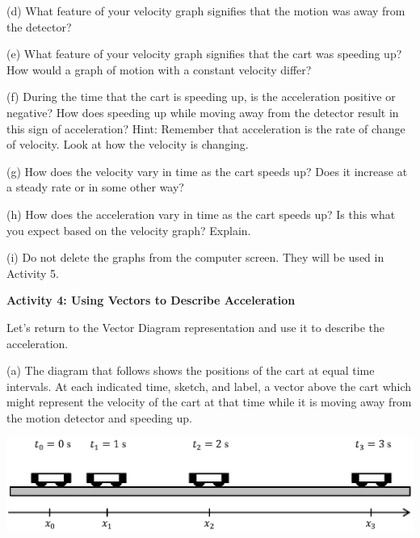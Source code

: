 (d) What feature of your velocity graph signifies that the motion was away from
the detector? 
\vspace{13mm}

(e) What feature of your velocity graph signifies that the cart was speeding
up? How would a graph of motion with a constant velocity differ? 
\vspace{13mm}

(f) During the time that the cart is speeding up, is the acceleration positive
or negative? How does speeding up while moving away from the detector result
in this sign of acceleration? Hint: Remember that acceleration is the rate of
change of velocity. Look at how the velocity is changing. 
\vspace{13mm}

(g) How does the velocity vary in time as the cart speeds up? Does it increase
at a steady rate or in some other way? 
\vspace{13mm}

(h) How does the acceleration vary in time as the cart speeds up? Is this what
you expect based on the velocity graph? Explain.
\vspace{13mm}

(i) Do not delete the graphs from the computer screen.  They will be used in Activity 5.
\vspace{10mm}

\textbf{Activity 4: Using Vectors to Describe Acceleration} 

Let's return to the Vector Diagram representation and use it to describe the
acceleration.

(a) The diagram that follows shows the positions of the cart at equal time intervals.
At each indicated time, sketch, and label, a vector above the cart which might represent
the velocity of the cart at that time while it is moving away from the motion
detector and speeding up.

\vspace{0.3cm}
{\par\centering \includegraphics{changing/carts_const_a.eps} \par}
\vspace{0.3cm}

